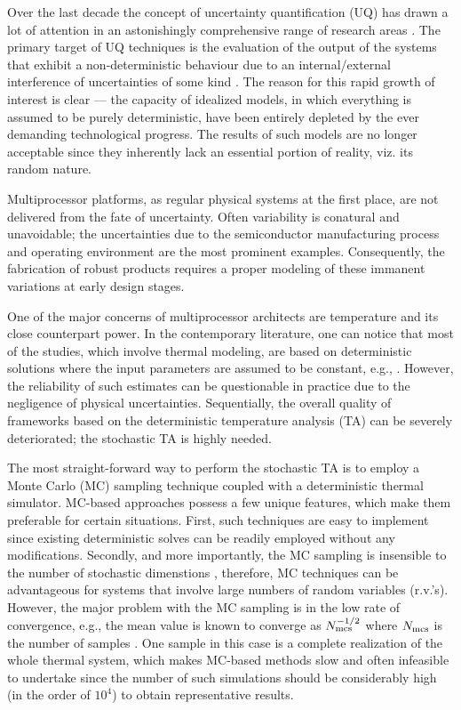 Over the last decade the concept of uncertainty quantification (UQ) has drawn a lot of attention in an astonishingly comprehensive range of research areas \cite{xiu2009}. The primary target of UQ techniques is the evaluation of the output of the systems that exhibit a non-deterministic behaviour due to an internal/external interference of uncertainties of some kind \cite{eldred2009}. The reason for this rapid growth of interest is clear --- the capacity of idealized models, in which everything is assumed to be purely deterministic, have been entirely depleted by the ever demanding technological progress. The results of such models are no longer acceptable since they inherently lack an essential portion of reality, viz. its random nature.

Multiprocessor platforms, as regular physical systems at the first place, are not delivered from the fate of uncertainty. Often variability is conatural and unavoidable; the uncertainties due to the semiconductor manufacturing process and operating environment are the most prominent examples. Consequently, the fabrication of robust products requires a proper modeling of these immanent variations at early design stages.

One of the major concerns of multiprocessor architects are temperature and its close counterpart power. In the contemporary literature, one can notice that most of the studies, which involve thermal modeling, are based on deterministic solutions where the input parameters are assumed to be constant, e.g., \cite{ukhov2012}. However, the reliability of such estimates can be questionable in practice due to the negligence of physical uncertainties. Sequentially, the overall quality of frameworks based on the deterministic temperature analysis (TA) can be severely deteriorated; the stochastic TA is highly needed.

The most straight-forward way to perform the stochastic TA is to employ a Monte Carlo (MC) sampling technique coupled with a deterministic thermal simulator. MC-based approaches possess a few unique features, which make them preferable for certain situations. First, such techniques are easy to implement since existing deterministic solves can be readily employed without any modifications. Secondly, and more importantly, the MC sampling is insensible to the number of stochastic dimenstions \cite{maitre2010}, therefore, MC techniques can be advantageous for systems that involve large numbers of random variables (r.v.'s). However, the major problem with the MC sampling is in the low rate of convergence, e.g., the mean value is known to converge as $N_\text{mcs}^{-{{1}/{2}}}$ where $N_\text{mcs}$ is the number of samples \cite{xiu2009, maitre2010}. One sample in this case is a complete realization of the whole thermal system, which makes MC-based methods slow and often infeasible to undertake since the number of such simulations should be considerably high (in the order of $10^4$) to obtain representative results.

